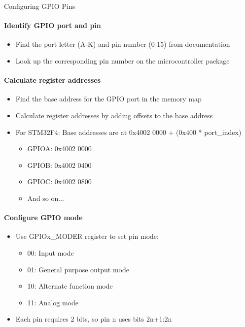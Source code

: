\begin{KR}{Configuring GPIO Pins}
\paragraph{Identify GPIO port and pin}
\begin{itemize}
    \item Find the port letter (A-K) and pin number (0-15) from documentation
    \item Look up the corresponding pin number on the microcontroller package
\end{itemize}

\paragraph{Calculate register addresses}
\begin{itemize}
    \item Find the base address for the GPIO port in the memory map
    \item Calculate register addresses by adding offsets to the base address
    \item For STM32F4: Base addresses are at 0x4002 0000 + (0x400 * port\_index)
    \begin{itemize}
        \item GPIOA: 0x4002 0000
        \item GPIOB: 0x4002 0400
        \item GPIOC: 0x4002 0800
        \item And so on...
    \end{itemize}
\end{itemize}

\paragraph{Configure GPIO mode}
\begin{itemize}
    \item Use GPIOx\_MODER register to set pin mode:
    \begin{itemize}
        \item 00: Input mode
        \item 01: General purpose output mode
        \item 10: Alternate function mode
        \item 11: Analog mode
    \end{itemize}
    \item Each pin requires 2 bits, so pin n uses bits 2n+1:2n
\end{itemize}


\end{KR}
